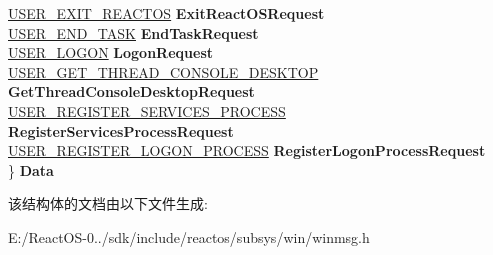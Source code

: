 \begin{DoxyCompactItemize}
\begin{tabbing}
\>\hyperlink{struct___u_s_e_r___e_x_i_t___r_e_a_c_t_o_s}{USER\_EXIT\_REACTOS} {\bfseries ExitReactOSRequest}\\
\>\hyperlink{struct___u_s_e_r___e_n_d___t_a_s_k}{USER\_END\_TASK} {\bfseries EndTaskRequest}\\
\>\hyperlink{struct___u_s_e_r___l_o_g_o_n}{USER\_LOGON} {\bfseries LogonRequest}\\
\>\hyperlink{struct___u_s_e_r___g_e_t___t_h_r_e_a_d___c_o_n_s_o_l_e___d_e_s_k_t_o_p}{USER\_GET\_THREAD\_CONSOLE\_DESKTOP} {\bfseries GetThreadConsoleDesktopRequest}\\
\>\hyperlink{struct___u_s_e_r___r_e_g_i_s_t_e_r___s_e_r_v_i_c_e_s___p_r_o_c_e_s_s}{USER\_REGISTER\_SERVICES\_PROCESS} {\bfseries RegisterServicesProcessRequest}\\
\>\hyperlink{struct___u_s_e_r___r_e_g_i_s_t_e_r___l_o_g_o_n___p_r_o_c_e_s_s}{USER\_REGISTER\_LOGON\_PROCESS} {\bfseries RegisterLogonProcessRequest}\\
\} {\bfseries Data}\\

\end{tabbing}\end{DoxyCompactItemize}


该结构体的文档由以下文件生成\+:\begin{DoxyCompactItemize}
\item 
E\+:/\+React\+O\+S-\/0../sdk/include/reactos/subsys/win/winmsg.\+h\end{DoxyCompactItemize}

